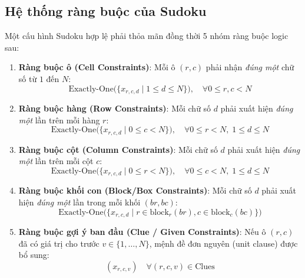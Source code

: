 \documentclass[a4paper,fleqn,nologo]{cas-sc}
\begin{document}
\subsection{Hệ thống ràng buộc của Sudoku}
Một cấu hình Sudoku hợp lệ phải thỏa mãn đồng thời 5 nhóm ràng buộc logic sau:

\begin{enumerate}
    \item \textbf{Ràng buộc ô (Cell Constraints)}: Mỗi ô $(r, c)$ phải nhận \textit{đúng một} chữ số từ $1$ đến $N$:
    \begin{equation}
    \text{Exactly-One}\Big( \{x_{r,c,d} \mid 1 \le d \le N\} \Big), \quad \forall 0 \le r, c < N
    \end{equation}
    
    \item \textbf{Ràng buộc hàng (Row Constraints)}: Mỗi chữ số $d$ phải xuất hiện \textit{đúng một} lần trên mỗi hàng $r$:
    \begin{equation}
    \text{Exactly-One}\Big( \{x_{r,c,d} \mid 0 \le c < N\} \Big), \quad \forall 0 \le r < N, \; 1 \le d \le N
    \end{equation}
    
    \item \textbf{Ràng buộc cột (Column Constraints)}: Mỗi chữ số $d$ phải xuất hiện \textit{đúng một} lần trên mỗi cột $c$:
    \begin{equation}
    \text{Exactly-One}\Big( \{x_{r,c,d} \mid 0 \le r < N\} \Big), \quad \forall 0 \le c < N, \; 1 \le d \le N
    \end{equation}
    
    \item \textbf{Ràng buộc khối con (Block/Box Constraints)}: Mỗi chữ số $d$ phải xuất hiện \textit{đúng một} lần trong mỗi khối $(br, bc)$:
    \begin{equation}
    \text{Exactly-One}\Big( \{x_{r,c,d} \mid r \in \text{block}_r(br), c \in \text{block}_c(bc)\} \Big)
    \end{equation}
    
    \item \textbf{Ràng buộc gợi ý ban đầu (Clue / Given Constraints)}: Nếu ô $(r, c)$ đã có giá trị cho trước $v \in \{1, \dots, N\}$, mệnh đề đơn nguyên (unit clause) được bổ sung:
    \begin{equation}
    (x_{r, c, v}) \quad \forall (r, c, v) \in \text{Clues}
    \end{equation}
\end{enumerate}
\end{document}

